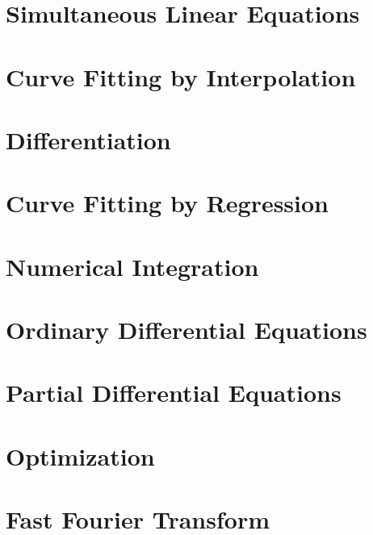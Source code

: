 \documentclass[12pt]{report}
\begin{document}
        \section{Simultaneous Linear Equations}

        \section{Curve Fitting by Interpolation}

        \section{Differentiation}

        \section{Curve Fitting by Regression}

        \section{Numerical Integration}

        \section{Ordinary Differential Equations}

        \section{Partial Differential Equations}

        \section{Optimization}

        \section{Fast Fourier Transform}
 
	\pagebreak
	\printbibliography
	\thispagestyle{empty}
	
\end{document}
